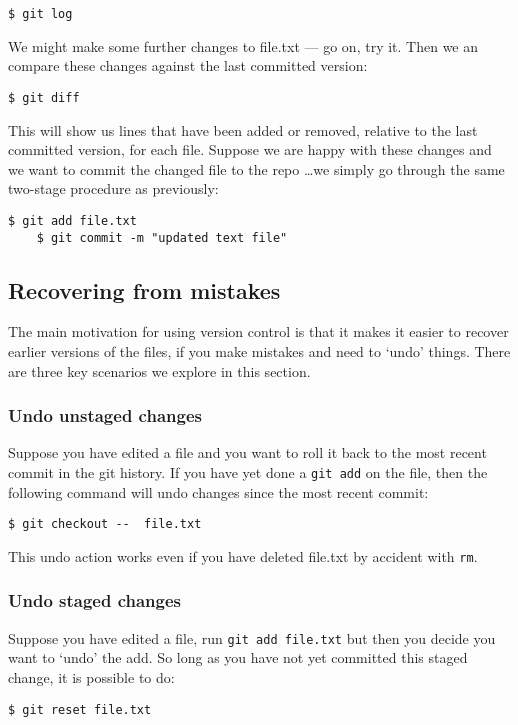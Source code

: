 \documentclass{article}
\begin{document}
\begin{lstlisting}[style=BashInputStyle]
    $ git log
\end{lstlisting}

We might make some further changes to file.txt --- go on, try it. Then we an
compare these changes against the last committed version:

\begin{lstlisting}[style=BashInputStyle]
    $ git diff
\end{lstlisting}

This will show us lines that have been added or removed, relative to the last
committed version, for each file. Suppose we are happy with these changes
and we want to commit the changed file to the repo \ldots we simply go
through the same two-stage procedure as previously:

\begin{lstlisting}[style=BashInputStyle]
    $ git add file.txt
    $ git commit -m "updated text file"
\end{lstlisting}

\subsection*{Recovering from mistakes}

The main motivation for using version control is that it makes it easier
to recover earlier versions of the files, if you make mistakes and need to
`undo' things. There are three key scenarios we explore in this section.


\subsubsection*{Undo unstaged changes}

Suppose you have edited a file and you want to roll it back to the most recent
commit in the git history.
If you have yet done a \texttt{git add} on the file, then the following command will undo changes since the most recent commit:
\begin{lstlisting}[style=BashInputStyle]
    $ git checkout --  file.txt
\end{lstlisting}
This undo action works even if you have deleted file.txt by accident with
\texttt{rm}.

\subsubsection*{Undo staged changes}
Suppose you have edited a file, run \texttt{git add file.txt} but then you decide you want to `undo' the add. So long as you have not yet committed this staged change, it is possible to do:
\begin{lstlisting}[style=BashInputStyle]
    $ git reset file.txt
\end{lstlisting}
\end{document}
